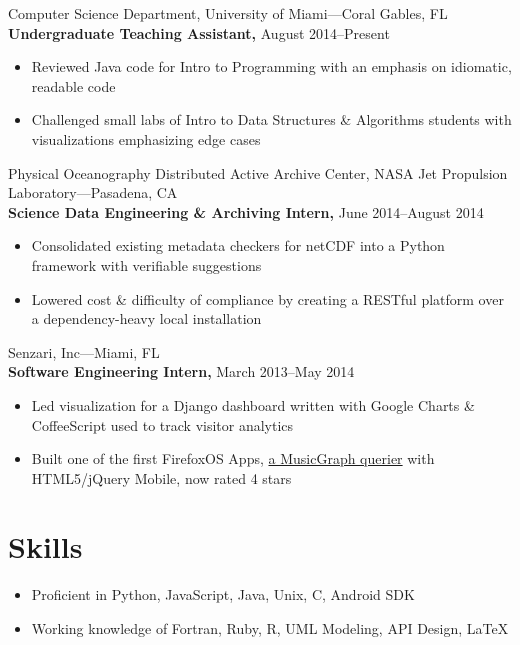 \documentclass[letterpaper,12pt]{article}
\begin{document}
\vskip 1.5mm

Computer Science Department, University of Miami---Coral Gables, FL\\
\textbf{Undergraduate Teaching Assistant,} August 2014--Present
\begin{itemize}
  \item Reviewed Java code for Intro to Programming with an emphasis on idiomatic, readable code
  \item Challenged small labs of Intro to Data Structures \& Algorithms students with visualizations emphasizing edge cases
\end{itemize}

\vskip 1.5mm

Physical Oceanography Distributed Active Archive Center, NASA Jet Propulsion Laboratory---Pasadena, CA\\
\textbf{Science Data Engineering \& Archiving Intern,} June 2014--August 2014
\begin{itemize}
  \item Consolidated existing metadata checkers for netCDF into a Python framework with verifiable suggestions
  \item Lowered cost \& difficulty of compliance by creating a RESTful platform over a dependency-heavy local installation
\end{itemize}

\vskip 1.5mm

Senzari, Inc---Miami, FL\\
\textbf{Software Engineering Intern,} March 2013--May 2014
\begin{itemize}
  \item Led visualization for a Django dashboard written with Google Charts \& CoffeeScript used to track visitor analytics
  \item Built one of the first FirefoxOS Apps, \href{https://marketplace.firefox.com/app/music-graph-1}{a MusicGraph querier} with HTML5/jQuery Mobile, now rated 4 stars
\end{itemize}

\vskip 3.5mm

\section*{Skills}
\begin{itemize}
  \item Proficient in Python, JavaScript, Java, Unix, C, Android SDK
  \item Working knowledge of Fortran, Ruby, R, UML Modeling, API Design, \LaTeX
\end{itemize}
\end{document}
